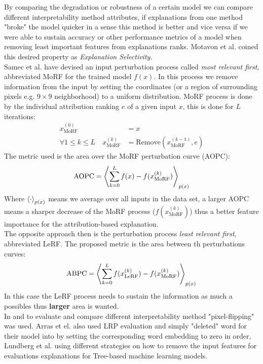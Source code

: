 \documentclass[12pt]{report}
\begin{document}
By comparing the degradation or robustness of a certain model we can compare different interpretability method attributes, if explanations from one method "broke" the model quicker in a sense this method is better and vice versa if we were able to sustain accuracy or other performance metrics of a model when removing least important features from explanations ranks. Motavon et al. \cite{DBLP:journals/corr/MontavonSM17} coined this desired property as \textit{Explanation Selectivity}.\\

Samec et al. \cite{https://doi.org/10.48550/arxiv.1509.06321} have devised an input perturbation process called \textit{most relevant first}, abbreviated MoRF for the trained model $f(x)$. In this process we remove information from the input by setting the coordinates (or a region of surrounding pixels e.g. $9 \times 9$ neighborhood) to a uniform distribution. MoRF process is done by the individual attribution ranking $e$ of a given input $x$, this is done for $L$ iterations:
\begin{align*}
	x_{\text{MoRF}}^{(0)} & = x  \\ 
	\forall 1 \le k \le L \quad x_{\text{MoRF}}^{(k)} &= \text{Remove} (x_{\text{MoRF}}^{(k-1)}, e)	
\end{align*}
The metric used is the area over the MoRF perturbation curve (AOPC):
\begin{align*}
	\text{AOPC} = \Braket{	\sum_{k=0}^{L}f(x) -f(x_{\text{MoRF}}^{(k)})}_{p(x)}
\end{align*}
Where $\Braket{\cdot}_{p(x)}$ means we average over all inputs in the data set, a larger AOPC means a sharper decrease of the MoRF process ($f(x_{\text{MoRF}}^{(k)})$) thus a better feature importance for the attribution-based explanation. \\

The opposite approach then is the perturbation process \textit{least relevant first}, abbreviated LeRF. The proposed metric is the area between th perturbations curves:
\begin{align*}
	\text{ABPC} = \Braket{	\sum_{k=0}^{L}f(x_{\text{LeRF}}^{(k)}) -f(x_{\text{MoRF}}^{(k)})}_{p(x)}
\end{align*}
In this case the LeRF process needs to sustain the information as much a possibles thus \textbf{larger} area is wanted.\\

In \cite{DBLP:journals/corr/abs-2003-07631} and \cite{LRP} to evaluate and compare different interpretability method "pixel-flipping" was used.  Arras et el. \cite{DBLP:journals/corr/ArrasHMMS16a} also used LRP evaluation and simply "deleted" word for their model into by setting the corresponding word embedding to zero in order, Lundberg et al. using different strategies on how to remove the input features \cite{DBLP:journals/corr/abs-1905-04610} for evaluations explanations for Tree-based machine learning models. \\
\end{document}
